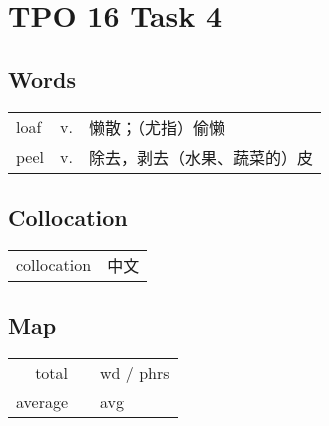 \section{TPO 16 Task 4}

\subsection{Words}

\begin{tabular}{lll}
    loaf & v. & 懒散；（尤指）偷懒      \\
    peel & v. & 除去，剥去（水果、蔬菜的）皮 \\
\end{tabular}

\subsection{Collocation}

\begin{tabular}{ll}
    collocation & 中文 \\
\end{tabular}

\subsection{Map}

\begin{tabular}{rc@{\quad$\to$\quad}l}
    total   &  & wd / phrs \\
    average &  & avg       \\
\end{tabular}

